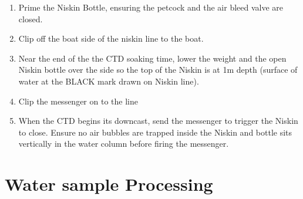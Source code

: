 \documentclass[]{book}
\providecommand{\tightlist}{%
  \setlength{\itemsep}{0pt}\setlength{\parskip}{0pt}}
\begin{document}
\begin{enumerate}
\def\labelenumi{\arabic{enumi}.}
\tightlist
\item
  Prime the Niskin Bottle, ensuring the petcock and the air bleed valve are closed.
\item
  Clip off the boat side of the niskin line to the boat.
\item
  Near the end of the the CTD soaking time, lower the weight and the open Niskin bottle over the side so the top of the Niskin is at 1m depth (surface of water at the BLACK mark drawn on Niskin line).
\item
  Clip the messenger on to the line
\item
  When the CTD begins its downcast, send the messenger to trigger the Niskin to close. Ensure no air bubbles are trapped inside the Niskin and bottle sits vertically in the water column before firing the messenger.
\end{enumerate}

\hypertarget{water-sample-processing}{%
\section{Water sample Processing}\label{water-sample-processing}}
\end{document}
